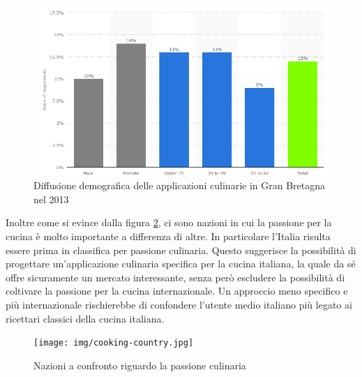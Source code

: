 \begin{itemize}
\begin{figure}[H]
	\centering
	\includegraphics[scale=0.3]{img/demographic-cookapp.png}
	\caption{Diffusione demografica delle applicazioni culinarie in Gran Bretagna nel
2013}	
	\label{fig:demographic-cookapp}
\end{figure}

Inoltre come si evince dalla figura \ref{fig:cooking-country}, ci sono
nazioni in cui la passione per la cucina è molto importante a differenza di
altre. In particolare l'Italia risulta essere prima in classifica per
passione culinaria.
Questo suggerisce la possibilità di progettare un'applicazione culinaria
specifica per la cucina italiana, la quale da sé offre sicuramente un mercato
interessante, senza però escludere la possibilità di
coltivare la passione per la cucina internazionale. 
Un approccio meno specifico e più internazionale rischierebbe di
confondere l'utente medio italiano più legato ai ricettari classici
della cucina italiana. 

\begin{figure}[H]
	\centering
	\texttt{[image: img/cooking-country.jpg]}
	\caption{Nazioni a confronto riguardo la passione culinaria}	
	\label{fig:cooking-country}
\end{figure}

\end{itemize}


